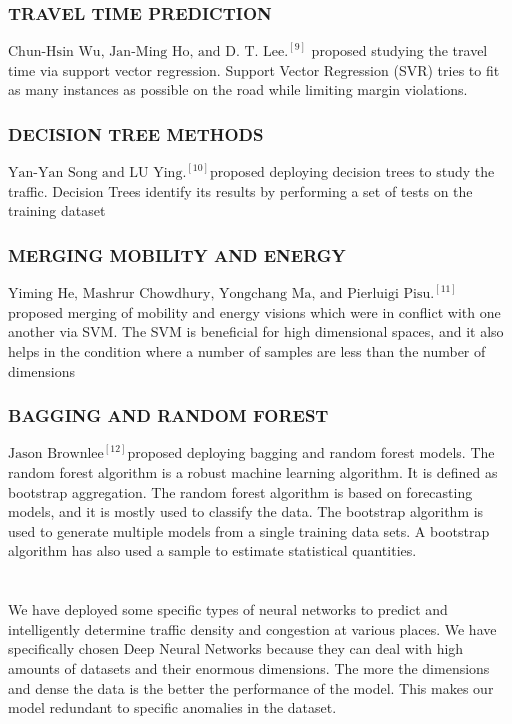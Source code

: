 \documentclass[12pt]{article}
\newcommand{\mainsize}{\fontsize{16pt}{12pt}\selectfont}
\begin{document}
\subsubsection{\textbf{TRAVEL TIME PREDICTION}}
$\text{Chun-Hsin Wu, Jan-Ming Ho, and D. T. Lee.}^{[9]}$ proposed studying the travel time via support vector regression. Support Vector Regression (SVR) tries to fit as many instances as possible on the road while limiting margin violations. 

\subsubsection{\textbf{DECISION TREE METHODS}}
$\text{Yan-Yan Song and LU Ying.}^{[10]}$proposed deploying decision trees to study the traffic. Decision Trees identify its results by performing a set of tests on the training dataset

\subsubsection{\textbf{MERGING MOBILITY AND ENERGY}}
$\text{Yiming He, Mashrur Chowdhury, Yongchang Ma, and Pierluigi Pisu.}^{[11]}$ proposed merging of mobility and energy visions which were in conflict with one another via SVM. The SVM is beneficial for high dimensional spaces, and it also helps in the condition where a number of samples are less than the number of dimensions

\subsubsection{\textbf{BAGGING AND RANDOM FOREST}}
$\text{Jason Brownlee}^{[12]}$proposed deploying bagging and random forest models. The random forest algorithm is a robust machine learning algorithm. It is defined as bootstrap aggregation. The random forest algorithm is based on forecasting models, and it is mostly used to classify the data. The bootstrap algorithm is used to generate multiple models from a single training data sets. A bootstrap algorithm has also used a sample to estimate statistical quantities.
\newpage 
\section{\mainsize{\textbf{DESIGN}}}
We have deployed some specific types of neural networks to predict and intelligently determine traffic density and congestion at various places. We have specifically chosen Deep Neural Networks because they can deal with high amounts of datasets and their enormous dimensions. The more the dimensions and dense the data is the better the performance of the model. This makes our model redundant to specific anomalies in the dataset. 
\end{document}
